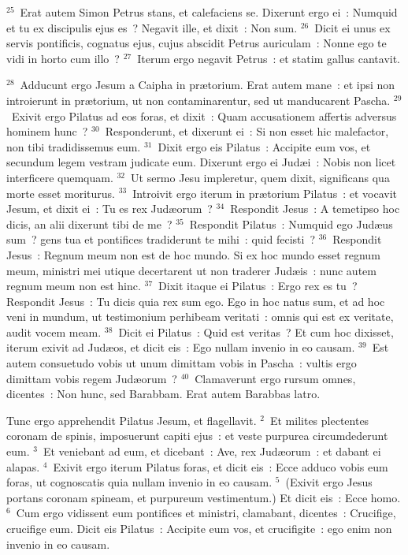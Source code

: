 ${}^{25}$~Erat autem Simon Petrus stans, et calefaciens se. Dixerunt ergo ei~: Numquid et tu ex discipulis ejus es~? Negavit ille, et dixit~: Non sum.
${}^{26}$~Dicit ei unus ex servis pontificis, cognatus ejus, cujus abscidit Petrus auriculam~: Nonne ego te vidi in horto cum illo~?
${}^{27}$~Iterum ergo negavit Petrus~: et statim gallus cantavit.


${}^{28}$~Adducunt ergo Jesum a Caipha in pr\ae torium. Erat autem mane~: et ipsi non introierunt in pr\ae torium, ut non contaminarentur, sed ut manducarent Pascha.
${}^{29}$~Exivit ergo Pilatus ad eos foras, et dixit~: Quam accusationem affertis adversus hominem hunc~?
${}^{30}$~Responderunt, et dixerunt ei~: Si non esset hic malefactor, non tibi tradidissemus eum.
${}^{31}$~Dixit ergo eis Pilatus~: Accipite eum vos, et secundum legem vestram judicate eum. Dixerunt ergo ei Jud\ae i~: Nobis non licet interficere quemquam.
${}^{32}$~Ut sermo Jesu impleretur, quem dixit, significans qua morte esset moriturus.
${}^{33}$~Introivit ergo iterum in pr\ae torium Pilatus~: et vocavit Jesum, et dixit ei~: Tu es rex Jud\ae orum~?
${}^{34}$~Respondit Jesus~: A temetipso hoc dicis, an alii dixerunt tibi de me~?
${}^{35}$~Respondit Pilatus~: Numquid ego Jud\ae us sum~? gens tua et pontifices tradiderunt te mihi~: quid fecisti~?
${}^{36}$~Respondit Jesus~: Regnum meum non est de hoc mundo. Si ex hoc mundo esset regnum meum, ministri mei utique decertarent ut non traderer Jud\ae is~: nunc autem regnum meum non est hinc.
${}^{37}$~Dixit itaque ei Pilatus~: Ergo rex es tu~? Respondit Jesus~: Tu dicis quia rex sum ego. Ego in hoc natus sum, et ad hoc veni in mundum, ut testimonium perhibeam veritati~: omnis qui est ex veritate, audit vocem meam.
${}^{38}$~Dicit ei Pilatus~: Quid est veritas~? Et cum hoc dixisset, iterum exivit ad Jud\ae os, et dicit eis~: Ego nullam invenio in eo causam.
${}^{39}$~Est autem consuetudo vobis ut unum dimittam vobis in Pascha~: vultis ergo dimittam vobis regem Jud\ae orum~?
${}^{40}$~Clamaverunt ergo rursum omnes, dicentes~: Non hunc, sed Barabbam. Erat autem Barabbas latro.

\lettrine[lines=10,image=true,loversize=0.05,lraise=-0.03]{T}{}unc ergo apprehendit Pilatus Jesum, et flagellavit.
${}^{2}$~Et milites plectentes coronam de spinis, imposuerunt capiti ejus~: et veste purpurea circumdederunt eum.
${}^{3}$~Et veniebant ad eum, et dicebant~: Ave, rex Jud\ae orum~: et dabant ei alapas.
${}^{4}$~Exivit ergo iterum Pilatus foras, et dicit eis~: Ecce adduco vobis eum foras, ut cognoscatis quia nullam invenio in eo causam.
${}^{5}$~(Exivit ergo Jesus portans coronam spineam, et purpureum vestimentum.) Et dicit eis~: Ecce homo.
${}^{6}$~Cum ergo vidissent eum pontifices et ministri, clamabant, dicentes~: Crucifige, crucifige eum. Dicit eis Pilatus~: Accipite eum vos, et crucifigite~: ego enim non invenio in eo causam.


